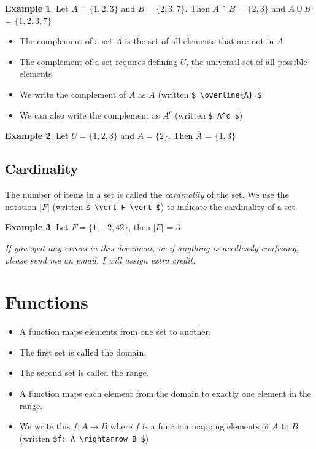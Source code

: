 \documentclass[]{article}
\theoremstyle{definition}
\newtheorem{exmp}{Example}[section]
\begin{document}
\begin{exmp}
Let $ A= \{1, 2, 3\}$ and $B = \{2,3,7\}$. Then $A \cap B$ = $\{2, 3\}$ and $A \cup B$ = $\{1,2, 3, 7\}$
\end{exmp}

\begin{itemize}
\item The complement of a set $A$ is the set of all elements that are not in $A$
\item The complement of a set requires defining $U$, the universal set of all possible elements
\item We write the complement of $A$ as $\overline{A}$ (written \verb|$ \overline{A} $| 
\item We can also write the complement as $A^c$  (written \verb|$ A^c $|)
\end{itemize}

\begin{exmp}
Let $ U= \{1, 2, 3\}$ and $A = \{2\}$. Then $\overline{A}$ = $\{1, 3\}$ 
\end{exmp}

\subsection{Cardinality}

The number of items in a set is called the \textit{cardinality} of the set. We use the notation $\vert F \vert$ (written \verb|$ \vert F \vert $|) to indicate the cardinality of a set.

\begin{exmp}
Let $ F = \{1, -2, 42 \}$, then $\vert F \vert$ = 3
\end{exmp}

\textit{If you spot any errors in this document, or if anything is needlessly confusing, please send me an email. I will assign extra credit.}

\section{Functions}

\begin{itemize}
\item A function maps elements from one set to another. 
\item The first set is called the domain.
\item The second set is called the range. 
\item A function maps each element from the domain to exactly one element in the range.
\item We write this $f: A \rightarrow B$ where $f$ is a function mapping elements of $A$ to $B$ (written \verb|$f: A \rightarrow B $|) 
\end{itemize}
\end{document}
